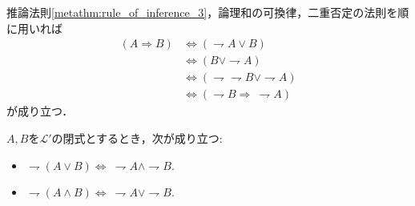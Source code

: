 	\begin{prf}
		推論法則\ref{metathm:rule_of_inference_3}，論理和の可換律，二重否定の法則を順に用いれば
		\begin{align}
			(A \Longrightarrow B) &\Longleftrightarrow (\rightharpoondown A \vee B) \\
			&\Longleftrightarrow (B \vee \rightharpoondown A) \\
			&\Longleftrightarrow (\rightharpoondown \rightharpoondown B \vee \rightharpoondown A) \\
			&\Longleftrightarrow (\rightharpoondown B \Longrightarrow\ \rightharpoondown A)
		\end{align}
		が成り立つ．
		\QED
	\end{prf}
	
	
	\begin{screen}
		\begin{metathm}[De Morganの法則]
			$A,B$を$\mathcal{L}'$の閉式とするとき，次が成り立つ:
			\begin{itemize}
				\item $\rightharpoondown (A \vee B) \Longleftrightarrow\ \rightharpoondown A \wedge \rightharpoondown B$.
			
				\item $\rightharpoondown (A \wedge B) \Longleftrightarrow\ \rightharpoondown A \vee \rightharpoondown B$.
			\end{itemize}
		\end{metathm}
	\end{screen}
	
